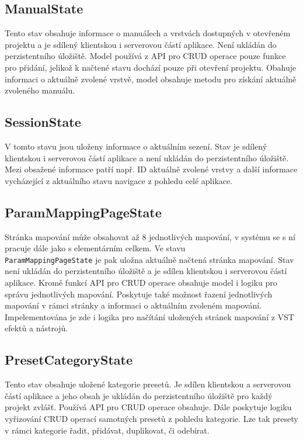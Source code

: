 \documentclass[thesis=M,czech]{FITthesis}[2019/03/06]
\begin{document}
	\subsection{ManualState}
	Tento stav obsahuje informace o manuálech a vrstvách dostupných v otevřeném projektu a je sdílený klientskou i serverovou částí aplikace. Není ukládán do perzistentního úložiště.
	Model používá z API pro CRUD operace pouze funkce pro přidání, jelikož k načtené stavu
	dochází pouze při otevření projektu. Obahuje informaci o aktuálně zvolené vrstvě, model obsahuje metodu
	pro získání aktuálně zvoleného manuálu.
	
	\subsection{SessionState}
	V tomto stavu jsou uloženy informace o aktuálním sezení. Stav je sdílený klientskou i serverovou částí aplikace a není ukládán do perzistentního úložiště.
	Mezi obsažené informace patří např. ID aktuálně zvolené vrstvy a další informace vycházející z aktuálního stavu navigace z pohledu celé aplikace.
	
	\subsection{ParamMappingPageState}
	Stránka mapování může obsahovat až 8 jednotlivých mapování, v systému se s ní pracuje dále jako s elementárním celkem. 
	Ve stavu \\\texttt{ParamMappingPageState} je pak uložna aktuálně načtená stránka mapování. Stav není ukládán do perzistentního úložiště a je sdílen klientskou i serverovou částí aplikace. 
	Kromě funkcí API pro CRUD operace obsahuje model i logiku pro správu jednotlivých mapování. 
	Poskytuje také možnost řazení jednotlivých mapování v rámci stránky a informaci
	o aktuálním zvoleném mapování. Impelementována je zde i logika pro načítání uložených stránek mapování
	z VST efektů a nástrojů.
	
	\subsection{PresetCategoryState}
	Tento stav obsahuje uložené kategorie presetů. Je sdílen klientskou a serverovou částí aplikace
	a jeho obsah je ukládán do perzistentního úložiště pro každý projekt zvlášť.
	Používá API pro CRUD operace obsahuje. Dále poskytuje logiku vyřizování CRUD operací samotných presetů
	z pohledu kategorie. Lze tak presety v rámci kategorie řadit, přidávat, duplikovat, či odebírat.
	
\end{document}
